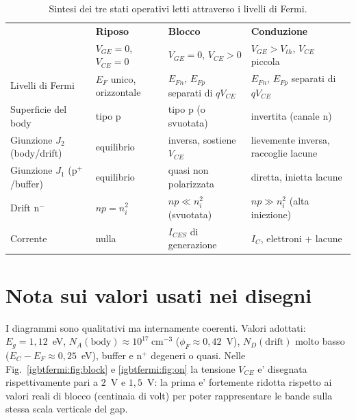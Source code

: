 \begin{table}[H]
\centering
\footnotesize
\begin{tabular}{@{}p{}p{}p{}p{}@{}}
\toprule
 & \textbf{Riposo} & \textbf{Blocco} & \textbf{Conduzione}\\
 & $V_{GE}=0$, $V_{CE}=0$ & $V_{GE}=0$, $V_{CE}>0$ & $V_{GE}>V_{th}$, $V_{CE}$ piccola\\
\midrule
Livelli di Fermi & $E_F$ unico, orizzontale & $E_{Fn}$, $E_{Fp}$ separati di $qV_{CE}$ & $E_{Fn}$, $E_{Fp}$ separati di $qV_{CE}$\\
Superficie del body & tipo p & tipo p (o svuotata) & invertita (canale n)\\
Giunzione $J_2$ (body/drift) & equilibrio & inversa, sostiene $V_{CE}$ & lievemente inversa, raccoglie lacune\\
Giunzione $J_1$ ($\mathrm{p^{+}}$/buffer) & equilibrio & quasi non polarizzata & diretta, inietta lacune\\
Drift $\mathrm{n^{-}}$ & $np=n_i^2$ & $np \ll n_i^2$ (svuotata) & $np \gg n_i^2$ (alta iniezione)\\
Corrente & nulla & $I_{CES}$ di generazione & $I_C$, elettroni + lacune\\
\bottomrule
\end{tabular}
\caption{Sintesi dei tre stati operativi letti attraverso i livelli di Fermi.}
\end{table}

\section*{Nota sui valori usati nei disegni}
\small
I diagrammi sono qualitativi ma internamente coerenti. Valori adottati:
$E_g = 1{,}12$~eV, $N_A(\text{body}) \approx 10^{17}~\mathrm{cm^{-3}}$
($\phi_F \approx 0{,}42$~V), $N_D(\text{drift})$ molto basso
($E_C-E_F \approx 0{,}25$~eV), buffer e $\mathrm{n^{+}}$ degeneri o quasi.
Nelle Fig.~\ref{igbtfermi:fig:block} e \ref{igbtfermi:fig:on} la tensione $V_{CE}$ e' disegnata
rispettivamente pari a $2$~V e $1{,}5$~V: la prima e' fortemente ridotta
rispetto ai valori reali di blocco (centinaia di volt) per poter rappresentare
le bande sulla stessa scala verticale del gap.

